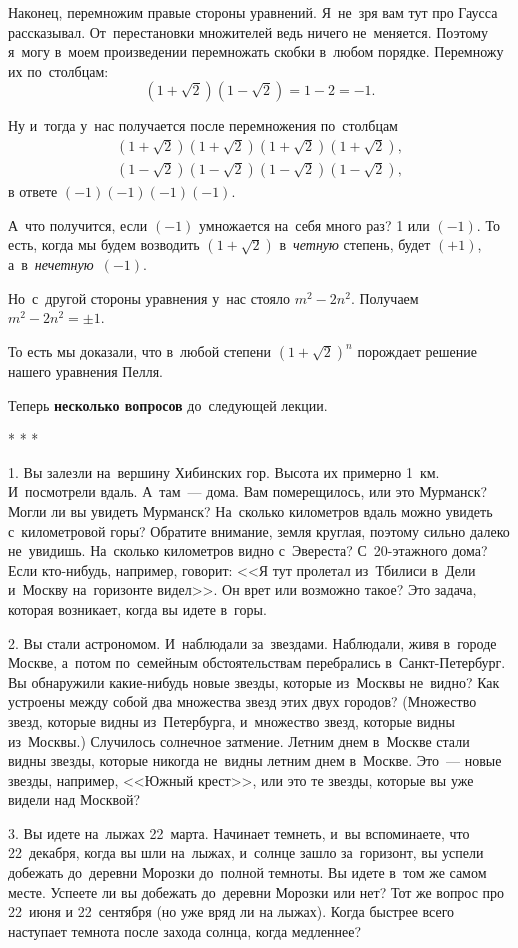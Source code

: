 Наконец, перемножим правые стороны уравнений. Я~не~зря вам тут про Гаусса рассказывал.\vadjust{\pagebreak}
От~перестановки множителей ведь ничего не~меняется. Поэтому я~могу в~моем произведении перемножать
скобки в~любом порядке. Перемножу их по~столбцам:
$$
(1+\sqrt2)(1-\sqrt2)=1-2=-1.
$$

Ну и~тогда у~нас получается после перемножения по~столбцам
\begin{gather*}
(1+\sqrt2)(1+\sqrt2)(1+\sqrt2)(1+\sqrt2),\\
(1-\sqrt2)(1-\sqrt2)(1-\sqrt2)(1-\sqrt2),
\end{gather*}
в ответе $(-1)(-1)(-1)(-1)$.

А~что получится, если $(-1)$ умножается на~себя много раз? 1 или $(-1)$. То есть, когда мы будем
возводить $(1+\sqrt2)$ в~\textit{четную} степень, будет $(+1)$, а~в~\textit{нечетную}~$(-1)$.

Но~с~другой стороны уравнения у~нас стояло $m^{2}-2n^{2}$. Получаем $m^{2}-2n^{2}=\pm1$.

То есть мы доказали, что в~любой степени $(1+\sqrt2)^{n}$ порождает решение нашего уравнения Пелля.

Теперь \textbf{несколько вопросов} до~следующей лекции.

\centerline{* * *}

1. Вы залезли на~вершину Хибинских гор. Высота их примерно 1~км. И~посмотрели вдаль. А~там~---
дома. Вам померещилось, или это Мурманск? Могли ли вы увидеть Мурманск? На~сколько километров вдаль
можно увидеть с~километровой горы? Обратите внимание, земля круглая, поэтому сильно далеко
не~увидишь. На~сколько километров видно с~Эвереста? С~20-этажного дома? Если кто-нибудь,
например, говорит: <<Я тут пролетал из~Тбилиси в~Дели и~Москву на~горизонте видел>>. Он врет или
возможно такое? Это задача, которая возникает, когда вы идете в~горы.

2. Вы стали астрономом. И~наблюдали за~звездами. Наблюдали, живя в~городе Москве, а~потом
по~семейным обстоятельствам перебрались в~Санкт-Петербург. Вы обнаружили какие-нибудь новые звезды,
которые из~Москвы не~видно? Как устроены между собой два множества звезд этих двух городов?
(Множество звезд, которые видны из~Петербурга, и~множество звезд, которые видны из~Москвы.)
Случилось солнечное затмение. Летним днем в~Москве стали видны звезды, которые никогда не~видны
летним днем в~Москве. Это~--- новые звезды, например, <<Южный крест>>, или это те звезды, которые вы
уже видели над Москвой?

3. Вы идете на~лыжах 22~марта. Начинает темнеть, и~вы вспоминаете, что 22~декабря, когда вы шли
на~лыжах, и~солнце зашло за~горизонт, вы успели добежать до~деревни Морозки до~полной темноты. Вы
идете в~том же самом месте. Успеете ли вы добежать до~деревни Морозки или нет? Тот же вопрос про 22~июня и 22~сентября (но уже вряд ли на лыжах).
Когда быстрее всего наступает темнота после
захода солнца, когда медленнее?

